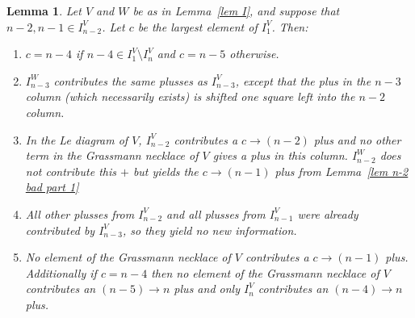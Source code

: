 \documentclass[11pt]{article}
\newtheorem{lem}[thm]{Lemma}
\theoremstyle{remark}
\theoremstyle{definition}
\begin{document}
  \begin{lem}\label{lem n-2 bad part 2}
    Let $V$ and $W$ be as in Lemma~\ref{lem I}, and suppose that $n-2,n-1 \in I_{n-2}^{V}$. Let $c$ be the largest element of $I_1^V$.  Then:
    \begin{enumerate}
  \item $c=n-4$ if $n-4\in I_1^V\setminus I_n^V$ and $c=n-5$ otherwise.
  \item $I_{n-3}^W$ contributes the same plusses as $I_{n-3}^V$, except that the plus in the $n-3$ column (which necessarily exists) is shifted one square left into the $n-2$ column.
  \item In the Le diagram of $V$, $I_{n-2}^{V}$ contributes a $c\rightarrow (n-2)$ plus and no other term in the Grassmann necklace of $V$ gives a plus in this column.  $I_{n-2}^W$ does not contribute this $+$ but yields the $c\rightarrow (n-1)$ plus from Lemma~\ref{lem n-2 bad part 1}
  \item All other plusses from $I_{n-2}^{V}$ and all plusses from $I_{n-1}^V$ were already contributed by $I_{n-3}^V$, so they yield no new information.
  \item No element of the Grassmann necklace of $V$ contributes a $c\rightarrow (n-1)$ plus.  Additionally if $c=n-4$ then no element of the Grassmann necklace of $V$ contributes an $(n-5)\rightarrow n$ plus and only $I_n^V$ contributes an $(n-4)\rightarrow n$ plus.
  \end{enumerate} 
\end{lem}
\end{document}
